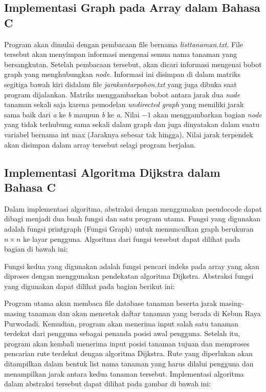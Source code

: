 \documentclass[conference]{IEEEtran}
\begin{document}
	\subsection{Implementasi Graph pada Array dalam Bahasa C}
Program akan dimulai dengan pembacaan file bernama
\textit{listtanaman.txt}. File tersebut akan menyimpan informasi mengenai semua nama tanaman yang bersangkutan. Setelah pembacaan tersebut, akan dicari informasi mengenai bobot graph
yang menghubungkan \textit{node}. Informasi ini disimpan di dalam
matriks segitiga bawah kiri didalam file \textit{jarakantarpohon.txt}
yang juga dibuka saat program dijalankan. Matriks menggambarkan bobot antara jarak dua \textit{node} tanaman sekali saja karena
pemodelan \textit{undirected graph} yang memiliki jarak sama baik
dari \textit{a} ke \textit{b} maupun \textit{b} ke \textit{a}. Nilai \begin{math} -1 \end{math} akan menggambarkan
bagian \textit{node} yang tidak terhubung sama sekali dalam graph
dan juga dinyatakan dalam suatu variabel bernama int max
(Jaraknya sebesar tak hingga). Nilai jarak terpendek akan
disimpan dalam array tersebut selagi program berjalan.

	\subsection{Implementasi Algoritma Dijkstra dalam Bahasa C}
Dalam implementasi algoritma, abstraksi dengan menggunakan pseudocode dapat dibagi menjadi dua buah fungsi dan
satu program utama. Fungsi yang digunakan adalah fungsi
printgraph (Fungsi Graph) untuk memunculkan graph berukuran \begin{math} n \times n \end{math} ke layar pengguna. Algoritma dari fungsi tersebut
dapat dilihat pada bagian di bawah ini:

Fungsi kedua yang digunakan adalah fungsi pencari indeks
pada array yang akan diproses dengan menggunakan pendekatan algoritma Dijkstra. Abstraksi fungsi yang digunakan
dapat dilihat pada bagian berikut ini:

Program utama akan membaca file database tanaman
beserta jarak masing-masing tanaman dan akan mencetak
daftar tanaman yang berada di Kebun Raya Purwodadi.
Kemudian, program akan menerima input salah satu tanaman
terdekat dari pengguna sebagai penanda posisi awal pengguna.
Setelah itu, program akan kembali menerima input posisi
tanaman tujuan dan memproses pencarian rute terdekat dengan
algoritma Dijkstra. Rute yang diperlukan akan ditampilkan
dalam bentuk list nama tanaman yang harus dilalui pengguna
dan menampilkan jarak antara kedua tanaman tersebut.
Implementasi algoritma dalam abstraksi tersebut dapat dilihat
pada gambar di bawah ini:
\end{document}
